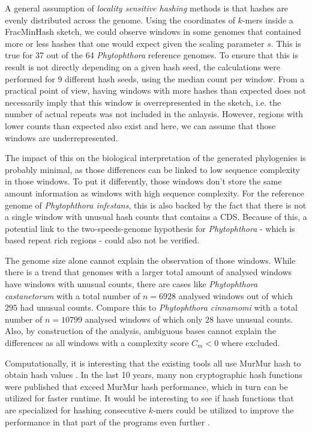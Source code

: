 A general assumption of \textit{locality sensitive hashing} methods is that
hashes are evenly distributed across the genome. Using the coordinates of
$k$-mers inside a FracMinHash sketch, we could observe windows in some genomes
that contained more or less hashes that one would expect given the scaling
parameter $s$. This is true for 37 out of the 64 \textit{Phytophthora} reference
genomes. To ensure that this is result is not directly depending on a given hash
seed, the calculations were performed for 9 different hash seeds, using the
median count per window. From a practical point of view, having windows with
more hashes than expected does not necessarily imply that this window is
overrepresented in the sketch, i.e. the number of actual repeats was not
included in the anlaysis. However, regions with lower counts than expected also
exist and here, we can assume that those windows are underrepresented.

The impact of this on the biological interpretation of the generated phylogenies
is probably minimal, as those differences can be linked to low sequence
complexity in those windows. To put it differently, those windows don't store
the same amount information as windows with high sequence complexity. For the
reference genome of \textit{Phytophthora infestans}, this is also backed by the
fact that there is not a single window with unusual hash counts that contains a
CDS. Because of this, a potential link to the two-speeds-genome hypothesis for
\textit{Phytophthora} - which is based repeat rich regions - could also not be
verified.

The genome size alone cannot explain the observation of those windows. While
there is a trend that genomes with a larger total amount of analysed windows
have windows with unusual counts, there are cases like \textit{Phytophthora
castanetorum} with a total number of $n=6928$ analysed windows out of which
$295$ had unusual counts. Compare this to \textit{Phytophthora cinnamomi} with a
total number of $n=10799$ analysed windows of which only $28$ have unusual
counts. Also, by construction of the analysis, ambiguous bases cannot explain
the differences as all windows with a complexity score $C_m < 0$ where excluded. 

Computationally, it is interesting that the existing tools all use MurMur hash
to obtain hash values
\cite{ondovMashFastGenome2016,bagciMicrobialPhylogeneticContext2021,irberLightweightCompositionalAnalysis2022}.
In the last 10 years, many non cryptographic hash functions were published that
exceed MurMur hash performance, which in turn can be utilized for faster
runtime. It would be interesting to see if hash functions that are specialized
for hashing consecutive $k$-mers could be utilized to improve the performance in
that part of the programs even further .

